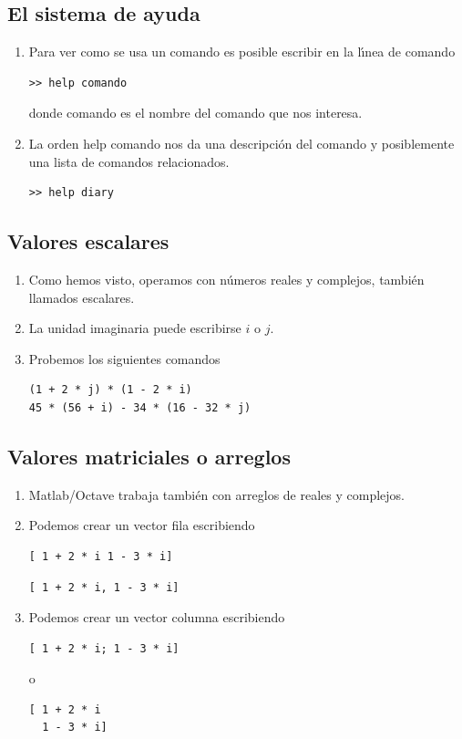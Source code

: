 \subsection{El sistema de ayuda}

\begin{enumerate}
\item Para ver como se usa un comando es posible escribir en la l\'{\i}nea
de comando
\begin{verbatim}
>> help comando
\end{verbatim}
donde comando es el nombre del comando que nos interesa.

\item La orden help comando nos da una descripci\'{o}n del comando y
posiblemente una lista de comandos relacionados.
\begin{verbatim}
>> help diary
\end{verbatim}
\end{enumerate}

\subsection{Valores escalares}

\begin{enumerate}
\item Como hemos visto, operamos con n\'{u}meros reales y complejos,
tambi\'{e}n llamados escalares.

\item La unidad imaginaria puede escribirse $i$ o $j$.

\item Probemos los siguientes comandos
\begin{verbatim}
(1 + 2 * j) * (1 - 2 * i)
45 * (56 + i) - 34 * (16 - 32 * j)
\end{verbatim}
\end{enumerate}

\subsection{Valores matriciales o arreglos}

\begin{enumerate}
\item Matlab/Octave trabaja tambi\'{e}n con arreglos de reales y
  complejos. 

\item Podemos crear un vector fila escribiendo
\begin{verbatim}
[ 1 + 2 * i 1 - 3 * i]
\end{verbatim}
\begin{verbatim}
[ 1 + 2 * i, 1 - 3 * i]
\end{verbatim}

\item Podemos crear un vector columna escribiendo
\begin{verbatim}
[ 1 + 2 * i; 1 - 3 * i]
\end{verbatim}
o
\begin{verbatim}
[ 1 + 2 * i
  1 - 3 * i]
\end{verbatim}
\end{enumerate}

